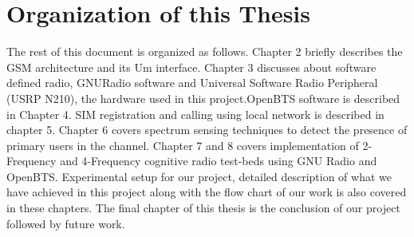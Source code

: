 \section{Organization of this Thesis}
The rest of this document is organized as follows. Chapter 2 briefly describes the GSM 
architecture and its Um interface. Chapter 3 discusses about software defined radio, GNURadio 
software and Universal Software Radio Peripheral (USRP N210), the hardware used in this 
project.OpenBTS software is described in Chapter 4. 
SIM registration and calling using local network  is described in chapter 5.
Chapter 6 covers spectrum sensing techniques to detect the presence of primary users in the 
channel.  Chapter 7 and 8 covers implementation of 2-Frequency and
4-Frequency cognitive radio test-beds using GNU Radio
and OpenBTS. Experimental setup for our project, 
detailed description of what we have achieved in this 
project along with the flow chart of our work is also covered in these chapters.
The final chapter of this thesis 
is the conclusion of our project followed by future work. 
